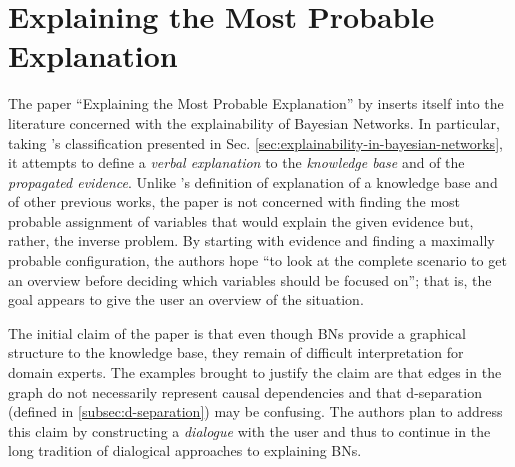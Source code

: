 
\section{Explaining the Most Probable Explanation} \label{sec:explaining-the-most-probable-explanation}
The paper \enquote{Explaining the Most Probable Explanation} by \cite{Butz2018} inserts itself into the literature concerned with the explainability of Bayesian Networks.
In particular, taking \cite{lacave2002review}'s classification presented in Sec. \ref{sec:explainability-in-bayesian-networks}, it attempts to define a \textit{verbal explanation} to the \textit{knowledge base} and of the \textit{propagated evidence}.
Unlike \cite{lacave2002review}'s definition of explanation of a knowledge base and of other previous works, the paper is not concerned with finding the most probable assignment of variables that would explain the given evidence but, rather, the inverse problem.
By starting with evidence and finding a maximally probable configuration, the authors hope \enquote{to look at the complete scenario to get an overview before deciding which variables should be focused on}; that is, the goal appears to give the user an overview of the situation.  

The initial claim of the paper is that even though BNs provide a graphical structure to the knowledge base, they remain of difficult interpretation for domain experts.
The examples brought to justify the claim are that edges in the graph do not necessarily represent causal dependencies and that d-separation (defined in \ref{subsec:d-separation}) may be confusing.
The authors plan to address this claim by constructing a \textit{dialogue} with the user and thus to continue in the long tradition of dialogical approaches to explaining BNs.

